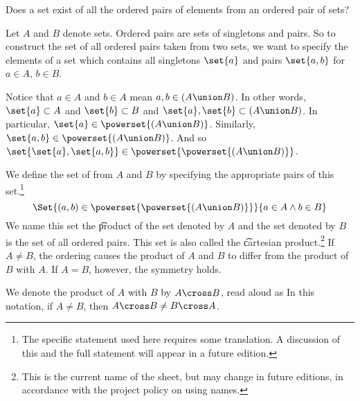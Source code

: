 

Does a set exist of all the ordered pairs of elements from an ordered pair of sets?


Let $A$ and $B$ denote sets.
Ordered pairs are sets of singletons and pairs.
So to construct the set of all ordered pairs taken from two sets, we want to specify the elements of a set which contains all singletons $\set{a}$ and pairs $\set{a, b}$ for $a \in A$, $b \in B$.

Notice that $a \in A$ and $b \in A$ mean $a, b \in (A \union B)$.
In other words, $\set{a} \subset A$ and $\set{b} \subset B$ and $\set{a}, \set{b} \subset (A \union B)$.
In particular, $\set{a} \in \powerset{(A \union B)}$.
Similarly, $\set{a, b} \in \powerset{(A \union B)}$.
And so $\set{\set{a}, \set{a, b}} \in \powerset{\powerset{(A \union B)}}$.

We define the set of  from $A$ and $B$ by specifying the appropriate pairs of this set.\footnote{The specific statement used here requires some translation. A discussion of this and the full statement will appear in a future edition.}
\[
  \Set{(a, b) \in \powerset{\powerset{(A \union B)}}}{a \in A \land b \in B}
\]
We name this set the \t{product} of the set denoted by $A$ and the set denoted by $B$ is the set of all ordered pairs.
This set is also called the \t{cartesian product}.\footnote{This is the current name of the sheet, but may change in future editions, in accordance with the project policy on using names.}
If $A \neq B$, the ordering causes the product of $A$ and $B$ to differ from the product of
$B$ with $A$.
If $A = B$, however, the symmetry holds.


We denote the product of $A$ with $B$ by $A \cross B$, read aloud as 
In this notation, if $A \neq B$, then $A \cross B \neq B \cross A$.
